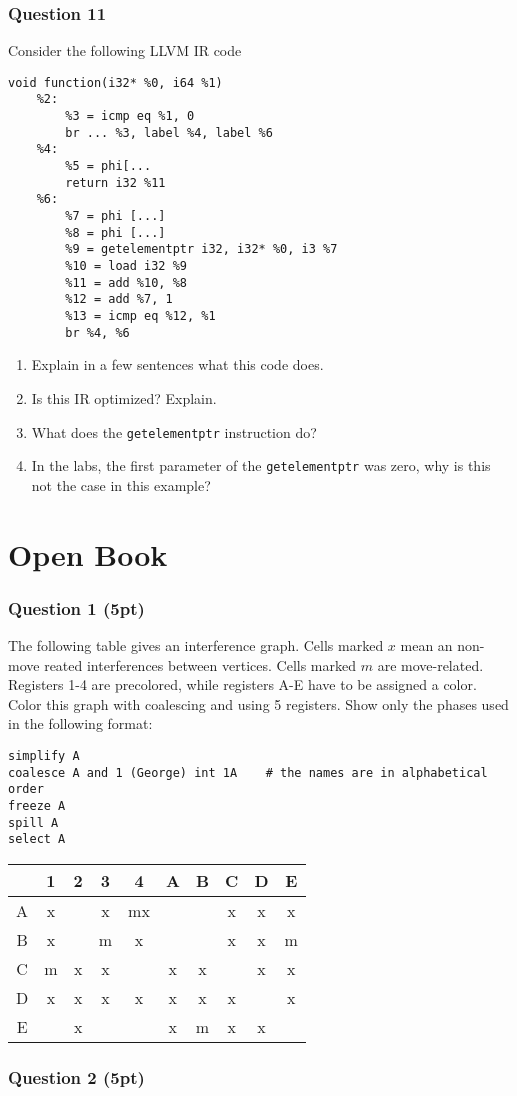 \documentclass{report}
\begin{document}
\section*{Question 11}
Consider the following LLVM IR code
\begin{lstlisting}
void function(i32* %0, i64 %1)
    %2:
        %3 = icmp eq %1, 0
        br ... %3, label %4, label %6
    %4:
        %5 = phi[...
        return i32 %11
    %6:
        %7 = phi [...]
        %8 = phi [...]
        %9 = getelementptr i32, i32* %0, i3 %7
        %10 = load i32 %9
        %11 = add %10, %8
        %12 = add %7, 1
        %13 = icmp eq %12, %1
        br %4, %6
\end{lstlisting}
\begin{enumerate}
    \item Explain in a few sentences what this code does.
    \item Is this IR optimized? Explain.
    \item What does the \texttt{getelementptr} instruction do?
    \item In the labs, the first parameter of the \texttt{getelementptr} was zero, why is this not the case in this example?
\end{enumerate}


\part{Open Book}
\section*{Question 1 (5pt)}
The following table gives an interference graph. Cells marked $x$ mean an non-move reated interferences between vertices. Cells marked $m$ are move-related. Registers 1-4 are precolored, while registers A-E have to be assigned a color. Color this graph with coalescing and using 5 registers. Show only the phases used in the following format:
\begin{lstlisting}
simplify A
coalesce A and 1 (George) int 1A    # the names are in alphabetical order
freeze A
spill A
select A
\end{lstlisting}
\begin{table}[ht]
    \centering
    \begin{tabular}{c | c c c c c c c c c}
            & 1 & 2 & 3 & 4 & A & B & C & D & E \\
            \hline
        A   & x &   & x &mx &   &   & x & x &  x \\
        B   & x &   & m & x &   &   & x & x & m \\
        C   & m & x & x &   & x & x &   & x & x \\
        D   & x & x & x & x & x & x & x &   & x \\
        E   &   & x  &  &  &  x & m  & x & x &   \\
    \end{tabular}
\end{table}

\section*{Question 2 (5pt)}
\end{document}
